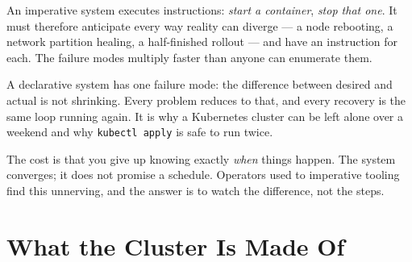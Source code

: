 \begin{conceptbox}
An imperative system executes instructions: \emph{start a container},
\emph{stop that one}. It must therefore anticipate every way reality can
diverge --- a node rebooting, a network partition healing, a half-finished
rollout --- and have an instruction for each. The failure modes multiply
faster than anyone can enumerate them.

\smallskip
A declarative system has one failure mode: the difference between desired and
actual is not shrinking. Every problem reduces to that, and every recovery is
the same loop running again. It is why a Kubernetes cluster can be left alone
over a weekend and why \texttt{kubectl apply} is safe to run twice.

\smallskip
The cost is that you give up knowing exactly \emph{when} things happen. The
system converges; it does not promise a schedule. Operators used to imperative
tooling find this unnerving, and the answer is to watch the difference, not the
steps.
\end{conceptbox}

\section{What the Cluster Is Made Of}

